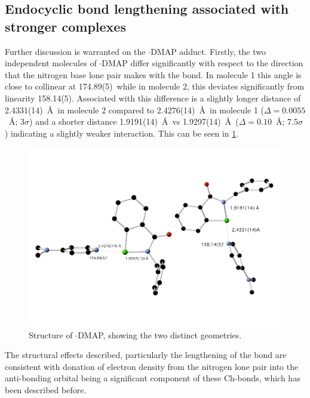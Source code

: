 \begin{refsection}
    \subsection{Endocyclic bond lengthening associated with stronger complexes}
    Further discussion is warranted on the $ \cdot $DMAP adduct.
    Firstly, the two independent molecules of $ \cdot $DMAP differ significantly with respect to the direction that the nitrogen base lone pair makes with the  bond.
    In molecule 1 this angle is close to collinear at 174.89(5)\degree\ while in molecule 2, this deviates significantly from linearity 158.14(5)\degree.
    Associated with this difference is a slightly longer  distance of 2.4331(14)~\AA\ in molecule 2 compared to 2.4276(14)~\AA\ in molecule 1 ($ \Delta =0.0055$~\AA{}; 3$ \sigma $) and a shorter  distance 1.9191(14)~\AA\ vs 1.9297(14)~\AA\ ($ \Delta =0.10$~\AA{}; 7.5$ \sigma $) indicating a slightly weaker interaction.
    This can be seen in \cref{fig:benzyl-dmap-xray-2}.
    
    \begin{figure}
      \centering
      \includegraphics[width=0.8\linewidth]{Figures/benzyl-dmap-xray-2.pdf}
      \caption{Structure of $ \cdot $DMAP, showing the two distinct geometries.}\label{fig:benzyl-dmap-xray-2}
    \end{figure}
    
    The structural effects described, particularly the lengthening of the  bond are consistent with donation of electron density from the nitrogen lone pair into the  anti-bonding orbital being a significant component of these  Ch-bonds, which has been described before\autocite{Pascoe2017}.
    

\end{refsection}
